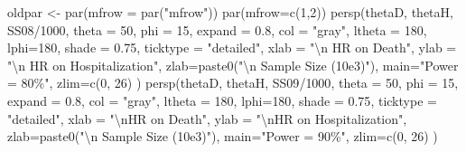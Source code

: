 \documentclass[
  letterpaper,
  DIV=11,
  numbers=noendperiod]{scrreprt}
\newenvironment{Shaded}{\begin{snugshade}}{\end{snugshade}}
\newcommand{\AttributeTok}[1]{\textcolor[rgb]{0.40,0.45,0.13}{#1}}
\newcommand{\DecValTok}[1]{\textcolor[rgb]{0.68,0.00,0.00}{#1}}
\newcommand{\FloatTok}[1]{\textcolor[rgb]{0.68,0.00,0.00}{#1}}
\newcommand{\FunctionTok}[1]{\textcolor[rgb]{0.28,0.35,0.67}{#1}}
\newcommand{\NormalTok}[1]{\textcolor[rgb]{0.00,0.23,0.31}{#1}}
\newcommand{\OtherTok}[1]{\textcolor[rgb]{0.00,0.23,0.31}{#1}}
\newcommand{\SpecialCharTok}[1]{\textcolor[rgb]{0.37,0.37,0.37}{#1}}
\newcommand{\StringTok}[1]{\textcolor[rgb]{0.13,0.47,0.30}{#1}}
\begin{document}
\begin{Shaded}
\begin{Highlighting}[]
\NormalTok{oldpar }\OtherTok{\textless{}{-}} \FunctionTok{par}\NormalTok{(}\AttributeTok{mfrow =} \FunctionTok{par}\NormalTok{(}\StringTok{"mfrow"}\NormalTok{))}
\FunctionTok{par}\NormalTok{(}\AttributeTok{mfrow=}\FunctionTok{c}\NormalTok{(}\DecValTok{1}\NormalTok{,}\DecValTok{2}\NormalTok{))}
\FunctionTok{persp}\NormalTok{(thetaD, thetaH, SS08}\SpecialCharTok{/}\DecValTok{1000}\NormalTok{, }\AttributeTok{theta =} \DecValTok{50}\NormalTok{, }\AttributeTok{phi =} \DecValTok{15}\NormalTok{, }\AttributeTok{expand =} \FloatTok{0.8}\NormalTok{, }\AttributeTok{col =} \StringTok{"gray"}\NormalTok{,}
      \AttributeTok{ltheta =} \DecValTok{180}\NormalTok{, }\AttributeTok{lphi=}\DecValTok{180}\NormalTok{, }\AttributeTok{shade =} \FloatTok{0.75}\NormalTok{,}
      \AttributeTok{ticktype =} \StringTok{"detailed"}\NormalTok{,}
      \AttributeTok{xlab =} \StringTok{"}\SpecialCharTok{\textbackslash{}n}\StringTok{ HR on Death"}\NormalTok{, }\AttributeTok{ylab =} \StringTok{"}\SpecialCharTok{\textbackslash{}n}\StringTok{ HR on Hospitalization"}\NormalTok{,}
      \AttributeTok{zlab=}\FunctionTok{paste0}\NormalTok{(}\StringTok{"}\SpecialCharTok{\textbackslash{}n}\StringTok{ Sample Size (10e3)"}\NormalTok{),}
      \AttributeTok{main=}\StringTok{"Power = 80\%"}\NormalTok{,}
      \AttributeTok{zlim=}\FunctionTok{c}\NormalTok{(}\DecValTok{0}\NormalTok{, }\DecValTok{26}\NormalTok{)}
\NormalTok{)}
\FunctionTok{persp}\NormalTok{(thetaD, thetaH, SS09}\SpecialCharTok{/}\DecValTok{1000}\NormalTok{, }\AttributeTok{theta =} \DecValTok{50}\NormalTok{, }\AttributeTok{phi =} \DecValTok{15}\NormalTok{, }\AttributeTok{expand =} \FloatTok{0.8}\NormalTok{, }\AttributeTok{col =} \StringTok{"gray"}\NormalTok{,}
      \AttributeTok{ltheta =} \DecValTok{180}\NormalTok{, }\AttributeTok{lphi=}\DecValTok{180}\NormalTok{, }\AttributeTok{shade =} \FloatTok{0.75}\NormalTok{,}
      \AttributeTok{ticktype =} \StringTok{"detailed"}\NormalTok{,}
      \AttributeTok{xlab =} \StringTok{"}\SpecialCharTok{\textbackslash{}n}\StringTok{HR on Death"}\NormalTok{, }\AttributeTok{ylab =} \StringTok{"}\SpecialCharTok{\textbackslash{}n}\StringTok{HR on Hospitalization"}\NormalTok{,}
      \AttributeTok{zlab=}\FunctionTok{paste0}\NormalTok{(}\StringTok{"}\SpecialCharTok{\textbackslash{}n}\StringTok{ Sample Size (10e3)"}\NormalTok{),}
      \AttributeTok{main=}\StringTok{"Power = 90\%"}\NormalTok{,}
      \AttributeTok{zlim=}\FunctionTok{c}\NormalTok{(}\DecValTok{0}\NormalTok{, }\DecValTok{26}\NormalTok{)}
\NormalTok{)}
\end{Highlighting}
\end{Shaded}
\end{document}
